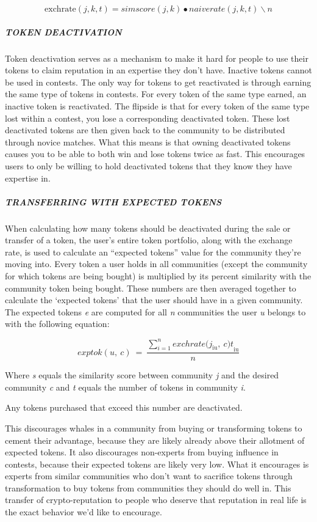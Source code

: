 \[\text{exchrate}\left( j,k,t \right) = simscore(j,k) \bullet naiverate(j,k,t)\backslash n\]

\subparagraph{TOKEN DEACTIVATION}\label{token-deactivation}

Token deactivation serves as a mechanism to make it hard for people to
use their tokens to claim reputation in an expertise they don't have.
Inactive tokens cannot be used in contests. The only way for tokens to
get reactivated is through earning the same type of tokens in contests.
For every token of the same type earned, an inactive token is
reactivated. The flipside is that for every token of the same type lost
within a contest, you lose a corresponding deactivated token. These lost
deactivated tokens are then given back to the community to be
distributed through novice matches. What this means is that owning
deactivated tokens causes you to be able to both win and lose tokens
twice as fast. This encourages users to only be willing to hold
deactivated tokens that they know they have expertise in.

\subparagraph{\texorpdfstring{\protect\hypertarget{_r8gpsdl6g5v5}{}{\protect\hypertarget{_9330mvdpn09}{}{}}TRANSFERRING
WITH EXPECTED
TOKENS}{TRANSFERRING WITH EXPECTED TOKENS}}\label{transferring-with-expected-tokens}

When calculating how many tokens should be deactivated during the sale
or transfer of a token, the user's entire token portfolio, along with
the exchange rate, is used to calculate an ``expected tokens'' value for
the community they're moving into. Every token a user holds in all
communities (except the community for which tokens are being bought) is
multiplied by its percent similarity with the community token being
bought. These numbers are then averaged together to calculate the
`expected tokens' that the user should have in a given community. The
expected tokens \emph{e} are computed for all \emph{n} communities the
user \emph{u} belongs to with the following equation:

\[exptok(u,\ c)\  = \ \frac{\sum_{i = 1}^{n}{exchrate({j_{\text{iu}},\ c)t}_{\text{iu}}}}{n}\]

Where \emph{s} equals the similarity score between community \emph{j}
and the desired community \emph{c} and \emph{t} equals the number of
tokens in community \emph{i}.

Any tokens purchased that exceed this number are deactivated.

This discourages whales in a community from buying or transforming
tokens to cement their advantage, because they are likely already above
their allotment of expected tokens. It also discourages non-experts from
buying influence in contests, because their expected tokens are likely
very low. What it encourages is experts from similar communities who
don't want to sacrifice tokens through transformation to buy tokens from
communities they should do well in. This transfer of crypto-reputation
to people who deserve that reputation in real life is the exact behavior
we'd like to encourage.

